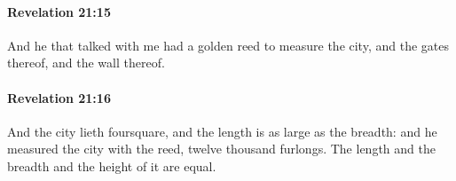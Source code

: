 		\paragraph{Revelation 21:15} %
			\label{REVELATIONNT-21-15}

			And he that talked with me had a golden reed to measure the city, and the gates thereof, and the wall thereof.

			\begin{framed}
			\scriptsize
				\begin{compactdesc}
					\item[SBLG] 
				\end{compactdesc}
			\end{framed}

		\paragraph{Revelation 21:16} %
			\label{REVELATIONNT-21-16}

			And the city lieth foursquare, and the length is as large as the breadth: and he measured the city with the reed, twelve thousand furlongs. The length and the breadth and the height of it are equal.

